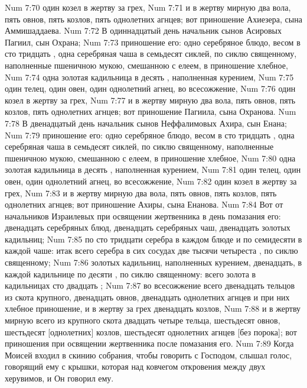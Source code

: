 \vs Num 7:70 один козел в жертву за грех,
\vs Num 7:71 и в жертву мирную два вола, пять овнов, пять козлов, пять однолетних агнцев; вот приношение Ахиезера, сына Аммишаддаева.
\vs Num 7:72 В одиннадцатый день начальник сынов Асировых Пагиил, сын Охрана;
\vs Num 7:73 приношение его: одно серебряное блюдо, весом в сто тридцать , одна серебряная чаша в семьдесят сиклей, по сиклю священному, наполненные пшеничною мукою, смешанною с елеем, в приношение хлебное,
\vs Num 7:74 одна золотая кадильница в десять , наполненная курением,
\vs Num 7:75 один телец, один овен, один однолетний агнец, во всесожжение,
\vs Num 7:76 один козел в жертву за грех,
\vs Num 7:77 и в жертву мирную два вола, пять овнов, пять козлов, пять однолетних агнцев; вот приношение Пагиила, сына Охранова.
\vs Num 7:78 В двенадцатый день начальник сынов Неффалимовых Ахира, сын Енана;
\vs Num 7:79 приношение его: одно серебряное блюдо, весом в сто тридцать , одна серебряная чаша в семьдесят сиклей, по сиклю священному, наполненные пшеничною мукою, смешанною с елеем, в приношение хлебное,
\vs Num 7:80 одна золотая кадильница в десять , наполненная курением,
\vs Num 7:81 один телец, один овен, один однолетний агнец, во всесожжение,
\vs Num 7:82 один козел в жертву за грех,
\vs Num 7:83 и в жертву мирную два вола, пять овнов, пять козлов, пять однолетних агнцев; вот приношение Ахиры, сына Енанова.
\rsbpar\vs Num 7:84 Вот  от начальников Израилевых при освящении жертвенника в день помазания его: двенадцать серебряных блюд, двенадцать серебряных чаш, двенадцать золотых кадильниц;
\vs Num 7:85 по сто тридцати  серебра в каждом блюде и по семидесяти в каждой чаше: итак всего серебра в сих сосудах две тысячи четыреста , по сиклю священному;
\vs Num 7:86 золотых кадильниц, наполненных курением, двенадцать, в каждой кадильнице по десяти , по сиклю священному: всего золота в кадильницах сто двадцать ;
\vs Num 7:87 во всесожжение всего двенадцать тельцов из скота крупного, двенадцать овнов, двенадцать однолетних агнцев и при них хлебное приношение, и в жертву за грех двенадцать козлов,
\vs Num 7:88 и в жертву мирную всего из крупного скота двадцать четыре тельца, шестьдесят овнов, шестьдесят [однолетних] козлов, шестьдесят однолетних агнцев [без порока]; вот приношения при освящении жертвенника после помазания его.
\vs Num 7:89 Когда Моисей входил в скинию собрания, чтобы говорить с Господом, слышал голос, говорящий ему с крышки, которая над ковчегом откровения между двух херувимов, и Он говорил ему.
